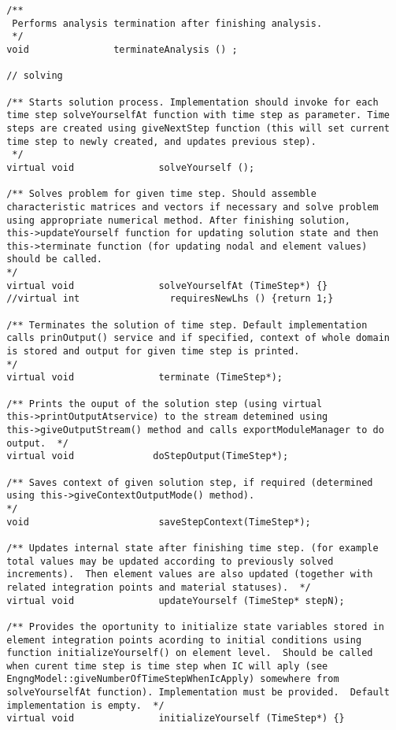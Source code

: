 \documentclass[a4paper]{article}
\begin{document}
{\begin{verbatim}
 /**
  Performs analysis termination after finishing analysis.  
  */
 void               terminateAnalysis () ;
  
 // solving

 /** Starts solution process. Implementation should invoke for each
 time step solveYourselfAt function with time step as parameter. Time
 steps are created using giveNextStep function (this will set current
 time step to newly created, and updates previous step).
  */
 virtual void               solveYourself ();

 /** Solves problem for given time step. Should assemble
 characteristic matrices and vectors if necessary and solve problem
 using appropriate numerical method. After finishing solution,
 this->updateYourself function for updating solution state and then
 this->terminate function (for updating nodal and element values)
 should be called.  
 */
 virtual void               solveYourselfAt (TimeStep*) {}
 //virtual int                requiresNewLhs () {return 1;}

 /** Terminates the solution of time step. Default implementation
 calls prinOutput() service and if specified, context of whole domain
 is stored and output for given time step is printed.  
 */
 virtual void               terminate (TimeStep*);

 /** Prints the ouput of the solution step (using virtual
 this->printOutputAtservice) to the stream detemined using
 this->giveOutputStream() method and calls exportModuleManager to do
 output.  */
 virtual void              doStepOutput(TimeStep*);

 /** Saves context of given solution step, if required (determined
 using this->giveContextOutputMode() method).  
 */
 void                       saveStepContext(TimeStep*);

 /** Updates internal state after finishing time step. (for example
 total values may be updated according to previously solved
 increments).  Then element values are also updated (together with
 related integration points and material statuses).  */
 virtual void               updateYourself (TimeStep* stepN);

 /** Provides the oportunity to initialize state variables stored in
 element integration points acording to initial conditions using
 function initializeYourself() on element level.  Should be called
 when curent time step is time step when IC will aply (see
 EngngModel::giveNumberOfTimeStepWhenIcApply) somewhere from
 solveYourselfAt function). Implementation must be provided.  Default
 implementation is empty.  */
 virtual void               initializeYourself (TimeStep*) {}


\end{verbatim}}
\end{document}
